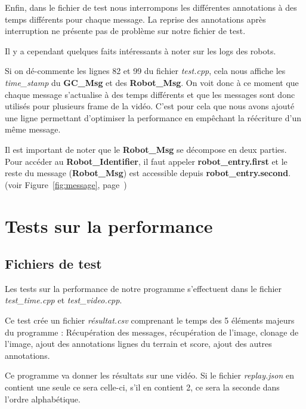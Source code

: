 \bigskip


Enfin, dans le fichier de test nous interrompons les différentes
annotations à des temps différents pour chaque message. La
reprise des annotations après interruption ne présente pas de
problème sur notre fichier de test.
\bigskip 

Il y a cependant quelques faits intéressants à noter sur les logs
des robots.
\bigskip

Si on dé-commente les lignes 82 et 99 du fichier
\textit{test.cpp}, cela nous affiche les \textit{time\_stamp} du
\textbf{GC\_Msg} et des \textbf{Robot\_Msg}.
On voit donc à ce moment que chaque message s'actualise à des
temps différents et que les messages sont donc utilisés pour
plusieurs frame de la vidéo. C'est pour cela que nous avons
ajouté une ligne permettant d'optimiser la performance en
empêchant la réécriture d'un même message.
\bigskip

Il est important de noter que le \textbf{Robot\_Msg} se décompose
en deux parties. Pour accéder au \textbf{Robot\_Identifier}, il
faut appeler \textbf{robot\_entry.first} et le reste du message
(\textbf{Robot\_Msg}) est accessible depuis
\textbf{robot\_entry.second}. (voir Figure~\ref{fig:message},
page~\pageref{fig:message})




\section{Tests sur la performance} \label{testperf}




\subsection{Fichiers de test}

Les tests sur la performance de notre programme s'effectuent dans
le fichier \textit{test\_time.cpp} et \textit{test\_video.cpp}.

Ce test crée un fichier \textit{résultat.csv} comprenant le temps
des 5 éléments majeurs du programme : Récupération des messages,
récupération de l'image, clonage de l'image, ajout des
annotations lignes du terrain et score, ajout des autres
annotations.
\bigskip

Ce programme va donner les résultats sur une vidéo. Si le fichier
\textit{replay.json} en contient une seule ce sera celle-ci, s'il
en contient 2, ce sera la seconde dans l'ordre alphabétique.
\bigskip

